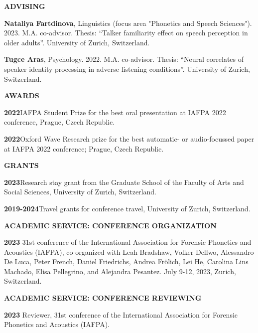 \documentclass[11pt]{article}
\newcommand{\hangpara}{
 \setlength{\parindent}{0in} %
 \hangindent=0.42in %
}
\begin{document}
\vskip 20pt
\begin{flushleft}
{\bf ADVISING}
\end{flushleft}
\hangpara \textbf{Nataliya Fartdinova}, Linguistics (focus area "Phonetics and Speech Sciences"). 2023. M.A. co-advisor. Thesis: “Talker familiarity effect on speech perception in older adults”. University of Zurich, Switzerland.
\vskip 6pt
\hangpara \textbf{Tugce Aras}, Psychology. 2022. M.A. co-advisor. Thesis: “Neural correlates of speaker identity processing in adverse listening conditions”. University of Zurich, Switzerland.




\vskip 20pt
\begin{flushleft}
{\bf AWARDS}
\end{flushleft}
\hangpara
{\bf 2022}\hspace{1ex}IAFPA Student Prize for the best oral presentation at IAFPA 2022 conference, Prague, Czech Republic.
\vskip 6pt
\hangpara
{\bf 2022}\hspace{1ex}Oxford Wave Research prize for the best automatic- or audio-focussed paper at IAFPA 2022 conference; Prague, Czech Republic. %




\vskip 20pt
\begin{flushleft}
{\bf GRANTS}
\end{flushleft}
\hangpara
{\bf 2023}\hspace{1ex}Research stay grant from the Graduate School of the Faculty of Arts and Social Sciences, University of Zurich, Switzerland. %
\vskip 6pt
\hangpara
{\bf 2019-2024}\hspace{1ex}Travel grants for conference travel, University of Zurich, Switzerland. %




\vskip 20pt
\begin{flushleft}
{\bf ACADEMIC SERVICE: CONFERENCE ORGANIZATION}
\end{flushleft}
\hangpara
{\bf 2023}\hspace{1ex} 31st conference of the International Association for Forensic Phonetics and Acoustics (IAFPA), co-organized with Leah Bradshaw, Volker Dellwo, Alessandro De Luca, Peter French, Daniel Friedrichs, Andrea Frölich, Lei He, Carolina Lins Machado, Elisa Pellegrino, and Alejandra Pesantez. July 9-12, 2023, Zurich, Switzerland.


\vskip 20pt
\begin{flushleft}
{\bf ACADEMIC SERVICE: CONFERENCE REVIEWING}
\end{flushleft}
\hangpara
{\bf 2023}\hspace{1ex} Reviewer, 31st conference of the International Association for Forensic Phonetics and Acoustics (IAFPA).
\end{document}

